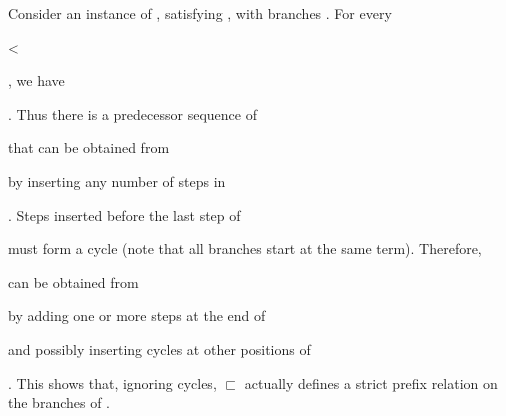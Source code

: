 Consider an instance of
, satisfying
, with branches
. For every \begin{coqdoccode} <
  \end{coqdoccode}, we
have \begin{coqdoccode} 
   
  \end{coqdoccode}. Thus there is a predecessor
sequence %
of \begin{coqdoccode}
  \end{coqdoccode} that can be obtained
from \begin{coqdoccode}
  \end{coqdoccode} by inserting any number of steps
in \begin{coqdoccode}
  \end{coqdoccode}. Steps inserted before the last
step of \begin{coqdoccode}
  \end{coqdoccode} must form a cycle (note that all
branches start at the same %
term). Therefore, \begin{coqdoccode}
  \end{coqdoccode} can be obtained
from \begin{coqdoccode}
  \end{coqdoccode} by adding one or more steps at
the end of \begin{coqdoccode}
  \end{coqdoccode} and possibly inserting cycles at
other positions of \begin{coqdoccode}
  \end{coqdoccode}. This shows that, ignoring
cycles, $\sqsubset$ actually defines a strict prefix relation on the
branches of .

%
%

